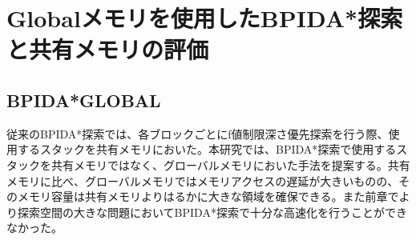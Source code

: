 \documentclass[a4paper,11pt,oneside,openany]{jsbook}
\begin{document}




\chapter{Globalメモリを使用したBPIDA*探索と共有メモリの評価}

\section{BPIDA*GLOBAL}
従来のBPIDA*探索\cite{HA17}では、各ブロックごとにf値制限深さ優先探索を行う際、使用するスタックを共有メモリにおいた。本研究では、BPIDA*探索で使用するスタックを共有メモリではなく、グローバルメモリにおいた手法を提案する。共有メモリに比べ、グローバルメモリではメモリアクセスの遅延が大きいものの、そのメモリ容量は共有メモリよりはるかに大きな領域を確保できる。また前章でより探索空間の大きな問題においてBPIDA*探索で十分な高速化を行うことができなかった。

\end{document}
